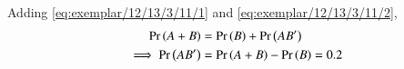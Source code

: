 Adding \eqref{eq:exemplar/12/13/3/11/1}
and
\eqref{eq:exemplar/12/13/3/11/2},
\begin{align}
\Pr\left(A+B\right) &=  \Pr\left(B\right)+ \Pr\left(AB^\prime\right) 
\\
\implies
	\Pr\left(AB^\prime\right)  &= \Pr\left(A+B\right) -  \Pr\left(B\right) = 0.2
\end{align}
